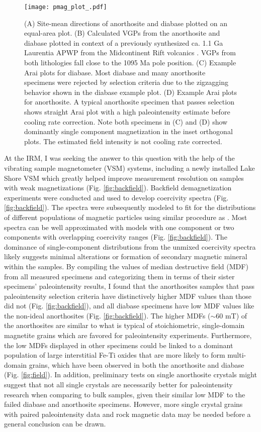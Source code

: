 \documentclass[draft]{agujournal2019}
\begin{document}
\begin{figure}
\noindent\texttt{[image: pmag\_plot\_.pdf]}
\caption{\small{(A) Site-mean directions of anorthosite and diabase plotted on an equal-area plot. (B) Calculated VGPs from the anorthosite and diabase plotted in context of a previously synthesized ca. 1.1 Ga Laurentia APWP from the Midcontinent Rift volcanics \citep{Swanson-Hysell2019a}. VGPs from both lithologies fall close to the 1095 Ma pole position. (C) Example Arai plots for diabase. Most diabase and many anorthosite specimens were rejected by selection criteria due to the zigzagging behavior shown in the diabase example plot. (D) Example Arai plots for anorthosite. A typical anorthosite specimen that passes selection shows straight Arai plot with a high paleointensity estimate before cooling rate correction. Note both specimens in (C) and (D) show dominantly single component magnetization in the inset orthogonal plots. The estimated field intensity is not cooling rate corrected.}}
\label{fig:pmag}
\end{figure}

At the IRM, I was seeking the answer to this question with the help of the vibrating sample magnetometer (VSM) systems, including a newly installed Lake Shore VSM which greatly helped improve measurement resolution on samples with weak magnetizations (Fig. \ref{fig:backfield}). Backfield demagnetization experiments were conducted and used to develop coercivity spectra (Fig. \ref{fig:backfield}). The spectra were subsequently modeled to fit for the distributions of different  populations of magnetic particles using similar procedure as \cite{Maxbauer2016a}. Most spectra can be well approximated with models with one component or two components with overlapping coercivity ranges (Fig. \ref{fig:backfield}). The dominance of single-component distributions from the unmixed coercivity spectra likely suggests minimal alterations or formation of secondary magnetic mineral within the samples. By compiling the values of median destructive field (MDF) from all measured specimens and categorizing them in terms of their sister specimens' paleointensity results, I found that the anorthosites samples that pass paleointensity selection criteria have distinctively higher MDF values than those did not (Fig. \ref{fig:backfield}), and all diabase specimens have low MDF values like the non-ideal anorthosites (Fig. \ref{fig:backfield}). The higher MDFs ($\sim$60 mT) of the anorthosites are similar to what is typical of stoichiometric, single-domain magnetite grains which are favored for paleointensity experiments. Furthermore, the low MDFs displayed in other specimens could be linked to a dominant population of large interstitial Fe-Ti oxides that are more likely to form multi-domain grains, which have been observed in both the anorthosite and diabase (Fig. \ref{fig:field}). In addition, preliminary tests on single anorthosite crystals might suggest that not all single crystals are necessarily better for paleointensity research when comparing to bulk samples, given their similar low MDF to the failed diabase and anorthosite specimens. However, more single crystal grains with paired paleointensity data and rock magnetic data may be needed before a general conclusion can be drawn. 
\end{document}
